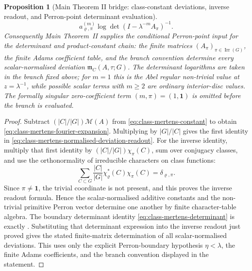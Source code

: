 \documentclass[11pt,a4paper]{amsart}
\theoremstyle{plain}
\newtheorem{proposition}[theorem]{Proposition}
\theoremstyle{definition}
\theoremstyle{remark}
\DeclareMathOperator{\Irr}{Irr}
\begin{document}
\begin{proposition}[Main Theorem II bridge: class-constant deviations,
  inverse readout, and Perron-point determinant evaluation]
\begin{equation}
        a_{\varrho,\pi}^{(m)}
        \log\det(I-\lambda^{-m}A_\pi)^{-1}.
  \end{equation}
  Consequently Main Theorem~II supplies the conditional Perron-point input for
  the determinant and product-constant chain: the finite matrices
  \((A_\pi)_{\pi\in\Irr(G)}\), the finite Adams coefficient table, and the
  branch convention determine every scalar-normalised deviation
  \(\mathfrak m_C(A,\tau;G)\).  The determinant logarithms are taken in the branch fixed above; for
  \(m=1\) this is the Abel regular non-trivial value at \(z=\lambda^{-1}\),
  while possible scalar terms with \(m\ge2\) are ordinary interior-disc
  values.  The formally singular zero-coefficient term
  \((m,\pi)=(1,\mathbf1)\) is omitted before the branch is evaluated.
\end{proposition}

\begin{proof}
  Subtract \((|C|/|G|)\mathcal M(A)\) from
  \eqref{eq:class-mertens-constant} to obtain
  \eqref{eq:class-mertens-fourier-expansion}.
  Multiplying by \(|G|/|C|\) gives the first identity in
  \eqref{eq:class-mertens-normalised-deviation-readout}.  For the inverse
  identity, multiply that first identity by \((|C|/|G|)\chi_\pi(C)\), sum over
  conjugacy classes, and use the orthonormality of irreducible characters on
  class functions:
  \[
    \sum_{C\subset G}\frac{|C|}{|G|}
      \chi_\varrho^\ast(C)\chi_\pi(C)=\delta_{\varrho,\pi}.
  \]
  Since \(\pi\neq\mathbf1\), the trivial coordinate is not present, and this
  proves the inverse readout formula.  Hence the scalar-normalised additive
  constants and the non-trivial primitive Perron vector determine one another
  by finite character-table algebra.
  The boundary determinant identity
  \eqref{eq:class-mertens-determinant} is exactly
  .  Substituting that
  determinant expression into the inverse readout just proved gives the stated
  finite-matrix determination of all scalar-normalised deviations.  This uses
  only the explicit Perron-boundary hypothesis \(\eta<\lambda\), the finite
  Adams coefficients, and the branch convention displayed in the statement.
\end{proof}
\end{document}
